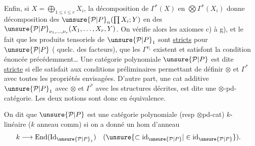 Enfin, si $X=\bigoplus_{1\leq i\leq r}X_i$, la décomposition de $\Gamma^*(X)$ en  $\bigotimes\Gamma^*(X_i)$ donne  décomposition des $\unsure{\mathcal P|P}_n(\prod X_i;Y)$ en des $\unsure{\mathcal P|P}_{\nu_1,\ldots,\nu_r}(X_1,\ldots,X_r,Y)$.
On vérifie alors les axiomes c) à g), et le fait que  les produits tensoriels de $\unsure{\mathcal P|P}_1$ sont \uline{stricts} pour $\unsure{\mathcal P|P}$ ( quelc. des facteurs), que les $\Gamma^{\nu_i}$ existent et satisfont la condition énoncée précédemment\ldots
{}
Une catégorie polynomiale $\unsure{\mathcal P|P}$ est dite \uline{stricte} si elle satisfait aux conditions préliminaires permettant de définir $\otimes$ et $\Gamma^*$ avec toutes les propriétés envisagées. D'autre part, une cat additive $\unsure{\mathcal P|P}_1$ avec $\otimes$ et $\Gamma^*$ avec les structures décrites, est dite une $\otimes$-pd-catégorie. Les deux notions sont donc en équivalence.

On dit que $\unsure{\mathcal P|P}$ est  une catégorie polynomiale (resp $\otimes$pd-cat) $k$-linéaire ($k$ anneau comm) si on a donné un hom d'anneau
\[k\longrightarrow\operatorname{End}(\mathrm{Id}_{\unsure{\mathcal P|P}_1})\quad(\unsure{\subset\mathrm{id}_\unsure{\mathcal P|P}|\in\mathrm{id}_\unsure{\mathcal P|P}}).\]

